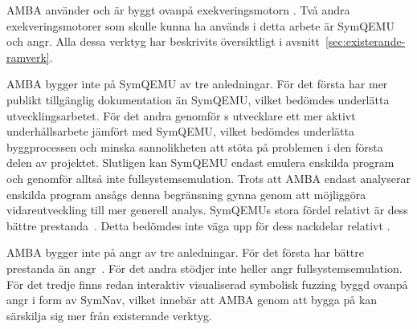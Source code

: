 AMBA använder och är byggt ovanpå exekveringsmotorn \stoe{}. Två andra
exekveringsmotorer som skulle kunna ha används i detta arbete är SymQEMU och
angr. Alla dessa verktyg har beskrivits översiktligt i
avsnitt~\ref{sec:existerande-ramverk}.

AMBA bygger inte på SymQEMU av tre anledningar. För det första har \stoe{} mer
publikt tillgänglig dokumentation än SymQEMU, vilket bedömdes underlätta
utvecklingsarbetet. För det andra genomför \stoe{}s utvecklare ett mer aktivt
underhållsarbete jämfört med SymQEMU, vilket bedömdes underlätta byggprocessen
och minska sannolikheten att stöta på problemen i den första delen av projektet.
Slutligen kan SymQEMU endast emulera enskilda program och genomför alltså inte
fullsystemsemulation. Trots att AMBA endast analyserar enskilda program ansågs
denna begränsning gynna \stoe{} genom att möjliggöra vidareutveckling till mer
generell analys. SymQEMUs stora fördel relativt \stoe{} är dess bättre
prestanda~\cite{systematic_comparison_symbex}.  Detta bedömdes inte väga upp för
dess nackdelar relativt \stoe{}.

AMBA bygger inte på angr av tre anledningar. För det första har \stoe{} bättre
prestanda än angr~\cite{systematic_comparison_symbex}. För det andra stödjer
inte heller angr fullsystemsemulation. För det tredje finns redan interaktiv
visualiserad symbolisk fuzzing byggd ovanpå angr i form av SymNav, vilket
innebär att AMBA genom att bygga på \stoe{} kan särskilja sig mer från
existerande verktyg.
